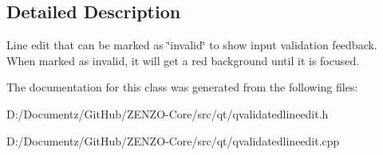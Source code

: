 \subsection{Detailed Description}
Line edit that can be marked as \char`\"{}invalid\char`\"{} to show input validation feedback. When marked as invalid, it will get a red background until it is focused. 

The documentation for this class was generated from the following files\+:\begin{DoxyCompactItemize}
\item 
D\+:/\+Documentz/\+Git\+Hub/\+Z\+E\+N\+Z\+O-\/\+Core/src/qt/qvalidatedlineedit.\+h\item 
D\+:/\+Documentz/\+Git\+Hub/\+Z\+E\+N\+Z\+O-\/\+Core/src/qt/qvalidatedlineedit.\+cpp\end{DoxyCompactItemize}
